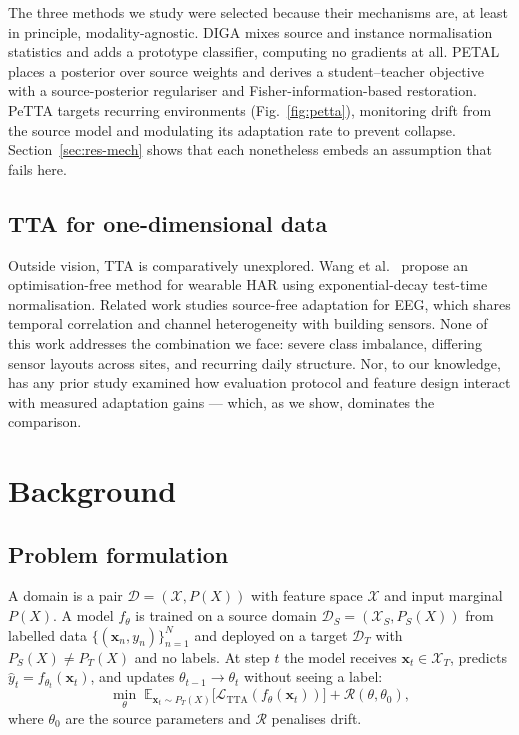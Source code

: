 \documentclass[a4paper,fleqn]{cas-dc}
\begin{document}
The three methods we study were selected because their mechanisms are, at least in
principle, modality-agnostic. DIGA \cite{diga} mixes source and instance normalisation
statistics and adds a prototype classifier, computing no gradients at all. PETAL
\cite{petal} places a posterior over source weights and derives a student--teacher
objective with a source-posterior regulariser and Fisher-information-based restoration.
PeTTA \cite{petta} targets recurring environments (Fig.~\ref{fig:petta}), monitoring drift from the source model
and modulating its adaptation rate to prevent collapse. Section~\ref{sec:res-mech} shows
that each nonetheless embeds an assumption that fails here.

\subsection{TTA for one-dimensional data}

Outside vision, TTA is comparatively unexplored. Wang et al.~\cite{wang2023} propose an
optimisation-free method for wearable HAR using exponential-decay test-time
normalisation. Related work studies source-free adaptation for EEG, which shares temporal
correlation and channel heterogeneity with building sensors. None of this work addresses
the combination we face: severe class imbalance, differing sensor layouts across sites,
and recurring daily structure. Nor, to our knowledge, has any prior study examined how
evaluation protocol and feature design interact with measured adaptation gains ---
which, as we show, dominates the comparison.

\section{Background}
\label{sec:background}

\subsection{Problem formulation}

A domain is a pair $\mathcal{D}=(\mathcal{X},P(X))$ with feature space $\mathcal{X}$ and
input marginal $P(X)$. A model $f_\theta$ is trained on a source domain
$\mathcal{D}_S=(\mathcal{X}_S,P_S(X))$ from labelled data $\{(\mathbf{x}_n,y_n)\}_{n=1}^N$
and deployed on a target $\mathcal{D}_T$ with $P_S(X)\neq P_T(X)$ and no labels. At step
$t$ the model receives $\mathbf{x}_t\in\mathcal{X}_T$, predicts
$\hat y_t=f_{\theta_t}(\mathbf{x}_t)$, and updates $\theta_{t-1}\to\theta_t$ without
seeing a label:
\begin{equation}
\min_{\theta}\;
\mathbb{E}_{\mathbf{x}_t\sim P_T(X)}\big[\mathcal{L}_{\mathrm{TTA}}(f_\theta(\mathbf{x}_t))\big]
+\mathcal{R}(\theta,\theta_0),
\label{eq:tta}
\end{equation}
where $\theta_0$ are the source parameters and $\mathcal{R}$ penalises drift.
\end{document}
